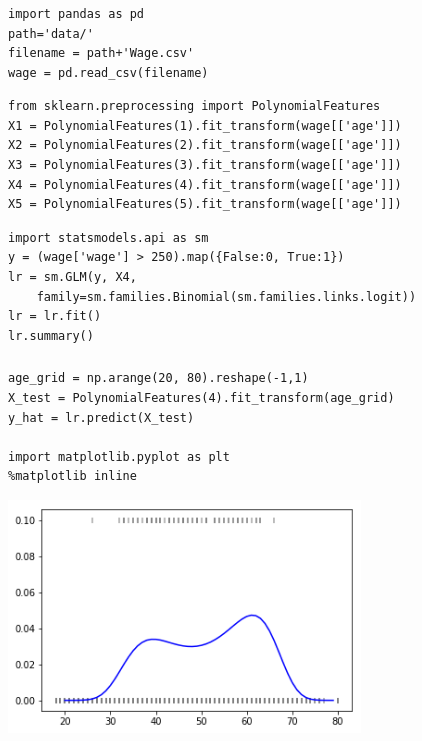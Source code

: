 
\begin{frame}[fragile]\frametitle{}
\tiny	
\begin{lstlisting}
import pandas as pd
path='data/'
filename = path+'Wage.csv'
wage = pd.read_csv(filename)
\end{lstlisting} 
\pause
\begin{lstlisting}
from sklearn.preprocessing import PolynomialFeatures
X1 = PolynomialFeatures(1).fit_transform(wage[['age']])
X2 = PolynomialFeatures(2).fit_transform(wage[['age']])
X3 = PolynomialFeatures(3).fit_transform(wage[['age']])
X4 = PolynomialFeatures(4).fit_transform(wage[['age']])
X5 = PolynomialFeatures(5).fit_transform(wage[['age']])
\end{lstlisting} 
\pause
\begin{lstlisting}
import statsmodels.api as sm
y = (wage['wage'] > 250).map({False:0, True:1})
lr = sm.GLM(y, X4, 
	family=sm.families.Binomial(sm.families.links.logit))
lr = lr.fit()
lr.summary()
\end{lstlisting} 
\end{frame}




\begin{frame}[fragile]\frametitle{}
\tiny	
\begin{lstlisting}
age_grid = np.arange(20, 80).reshape(-1,1)
X_test = PolynomialFeatures(4).fit_transform(age_grid)
y_hat = lr.predict(X_test)

import matplotlib.pyplot as plt
%matplotlib inline
\end{lstlisting} 
\includegraphics[width=0.7\textwidth]{fig/logisticprob}
\end{frame}


